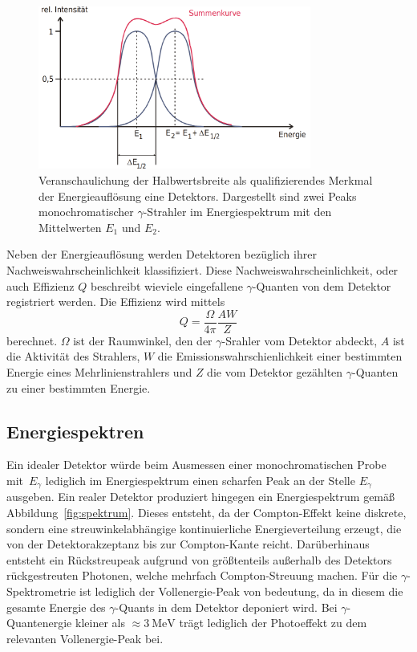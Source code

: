 \begin{figure}
  \centering
  \includegraphics[width=0.8\textwidth]{Pics/energieaufloesung.png}
  \caption{Veranschaulichung der Halbwertsbreite als qualifizierendes Merkmal der Energieauflösung eine Detektors.
  Dargestellt sind zwei Peaks monochromatischer $\gamma$-Strahler im Energiespektrum mit den
  Mittelwerten $E_1$ und $E_2$\cite{anleitung}.}
  \label{fig:energieauflösung}
\end{figure}

Neben der Energieauflösung werden Detektoren bezüglich ihrer Nachweiswahrscheinlichkeit
klassifiziert. Diese Nachweiswahrscheinlichkeit, oder auch Effizienz $Q$
beschreibt wieviele eingefallene $\gamma$-Quanten von dem Detektor
registriert werden.
Die Effizienz wird mittels
\begin{equation}
  \label{eqn:effizienz}
  Q = \frac{\Omega}{4\pi}\frac{AW}{Z}
\end{equation}
berechnet. $\Omega$ ist der Raumwinkel, den der $\gamma$-Srahler vom Detektor abdeckt,
$A$ ist die Aktivität des Strahlers, $W$ die Emissionswahrschienlichkeit einer bestimmten
Energie eines Mehrlinienstrahlers und $Z$ die vom Detektor gezählten $\gamma$-Quanten
zu einer bestimmten Energie.
\FloatBarrier
\subsection{Energiespektren}
\label{subsec:energiespektrum}

Ein idealer Detektor würde beim Ausmessen einer monochromatischen Probe mit~$E_\gamma$
lediglich im Energiespektrum einen scharfen Peak an der Stelle $E_\gamma$
ausgeben. Ein realer Detektor produziert hingegen ein Energiespektrum gemäß
Abbildung~\ref{fig:spektrum}. Dieses entsteht, da der Compton-Effekt
keine diskrete, sondern eine streuwinkelabhängige kontinuierliche Energieverteilung
erzeugt, die von der Detektorakzeptanz bis zur Compton-Kante reicht.
Darüberhinaus entsteht ein Rückstreupeak aufgrund von größtenteils
außerhalb des Detektors rückgestreuten Photonen, welche mehrfach Compton-Streuung
machen.
Für die $\gamma$-Spektrometrie ist lediglich der Vollenergie-Peak
von bedeutung, da in diesem die gesamte Energie des $\gamma$-Quants
in dem Detektor deponiert wird. Bei $\gamma$-Quantenergie kleiner
als $\approx\SI{3}{\MeV}$ trägt lediglich der Photoeffekt zu dem relevanten
Vollenergie-Peak bei.


